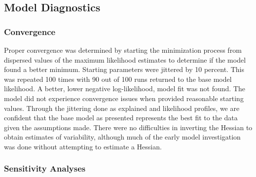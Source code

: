 \documentclass[11pt,
  english,
  a4paper,
]{article}
\begin{document}
\leavevmode\tagmcend\tagstructend\par


\hypertarget{model-diagnostics}{%
\subsection{Model Diagnostics}\label{model-diagnostics}}

\leavevmode\tagmcend\tagstructend


\hypertarget{convergence}{%
\subsubsection{Convergence}\label{convergence}}

\leavevmode\tagmcend\tagstructend


Proper convergence was determined by starting the minimization process from dispersed values of the maximum likelihood estimates to determine if the model found a better minimum. Starting parameters were jittered by 10 percent. This was repeated 100 times with 90 out of 100 runs returned to the base model likelihood. A better, lower negative log-likelihood, model fit was not found. The model did not experience convergence issues when provided reasonable starting values. Through the jittering done as explained and likelihood profiles, we are confident that the base model as presented represents the best fit to the data given the assumptions made. There were no difficulties in inverting the Hessian to obtain estimates of variability, although much of the early model investigation was done without attempting to estimate a Hessian.

\leavevmode\tagmcend\tagstructend\par


\hypertarget{sensitivities}{%
\subsubsection{Sensitivity Analyses}\label{sensitivities}}

\leavevmode\tagmcend\tagstructend

\end{document}
